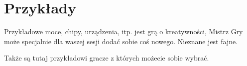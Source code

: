 \chapter{Przykłady}
Przykładowe moce, chipy, urządzenia, itp.
\kosmoramus{} jest grą o kreatywności, Mistrz Gry może specjalnie dla waszej sesji dodać sobie coś nowego.
Nieznane jest fajne.

Także są tutaj przykładowi gracze z których możecie sobie wybrać.







